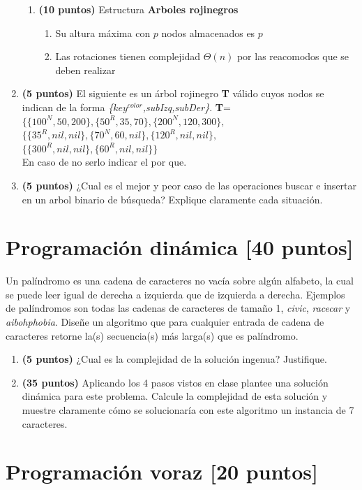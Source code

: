 \documentclass[10pt,twocolumn]{article}
\begin{document}
\begin{enumerate}
\begin{enumerate}
\item \textbf{(10 puntos)} Estructura \textbf{Arboles rojinegros}
  \begin{enumerate}
  \item Su altura m\'axima con $p$ nodos almacenados es $p$
  \item Las rotaciones tienen complejidad ${\Theta (n)}$ por las reacomodos que se deben realizar
  \end{enumerate}
\end{enumerate}
	\item \textbf{(5 puntos)} El siguiente es un \'arbol rojinegro {\bf T} v\'alido cuyos nodos se indican de la forma {\it \{$key^{color}$,subIzq,subDer\}}.
  {\bf T}=$\{\{100^{N},50,200\},\{50^{R},35,70\},\{200^{N},120,300\},$\\
  $\{\{35^{R},nil,nil\},\{70^{N},60,nil\},\{120^{R},nil,nil\},$\\
  $\{\{300^{R},nil,nil\},\{60^{R},nil,nil\}\}$\\ En caso de no serlo indicar el por que.
  \item \textbf{(5 puntos)} ¿Cual es el mejor y peor caso de las operaciones buscar e insertar en un arbol binario de búsqueda? Explique claramente cada situación.
\end{enumerate}

\section{Programación dinámica \small{[40 puntos]}} 

Un palíndromo es una cadena de caracteres no vacía sobre algún alfabeto, la cual se puede leer igual de derecha a izquierda que de izquierda a derecha. Ejemplos de palíndromos son todas las cadenas de caracteres de tamaño 1, \textit{civic}, \textit{racecar} y \textit{aibohphobia}. Diseñe un algoritmo que para cualquier entrada de cadena de caracteres retorne la(s) secuencia(s) más larga(s) que es palíndromo.

\begin{enumerate}
	\item \textbf{(5 puntos)} ¿Cual es la complejidad de la solución ingenua? Justifique.
	\item \textbf{(35 puntos)} Aplicando los 4 pasos vistos en clase plantee una solución dinámica para este problema. Calcule la complejidad de esta solución y muestre claramente cómo se solucionaría con este algoritmo un instancia de 7 caracteres.
\end{enumerate}
\section{Programación voraz \small{[20 puntos]}} 
\end{document}
